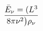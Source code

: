 \documentclass[preview]{standalone}
\begin{document}
\begin{align*}
\bar{E}_{\nu}=( L ^{3}  \over 8 \pi \nu^{2}\big) \rho_{\nu}
\end{align*}
\end{document}

